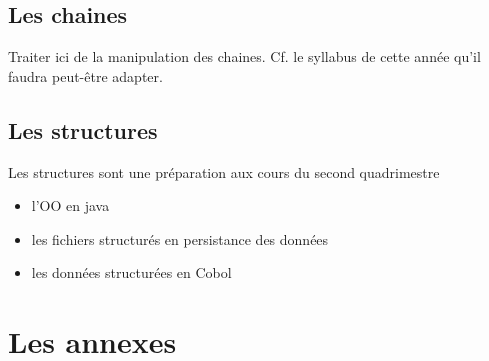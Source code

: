 \documentclass[a4paper,doubleside]{book}
\begin{document}
		\chapter{Les chaines}
			\begin{Note}
			Traiter ici de la manipulation des chaines.
			Cf. le syllabus de cette année
			qu'il faudra peut-être adapter.
			\end{Note}
		\chapter{Les structures}
			\begin{Note}
			Les structures sont une préparation aux cours
			du second quadrimestre
			\begin{itemize}
			\item l'OO en java
			\item les fichiers structurés en persistance des données
			\item les données structurées en Cobol
			\end{itemize}
			\end{Note}

	\appendix
	
	\part{Les annexes}
		
		
	
	
\end{document}
